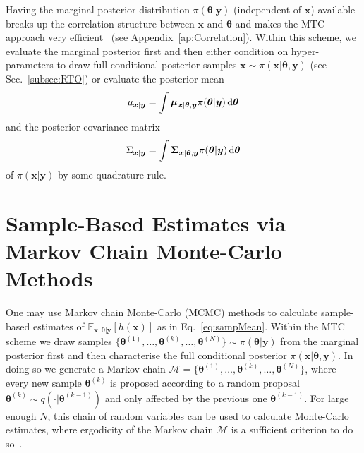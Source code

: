 Having the marginal posterior distribution $\pi (\bm{\theta}| \bm{y})$ (independent of $\bm{x}$) available breaks up the correlation structure between $\bm{x}$ and $\bm{\theta}$ and makes the MTC approach very efficient~\cite{fox2016fast} (see Appendix~\ref{ap:Correlation}).
Within this scheme, we evaluate the marginal posterior first and then either condition on hyper-parameters to draw full conditional posterior samples $\bm{x} \sim \pi (\bm{x} | \bm{\theta}, \bm{y})$ (see Sec.~\ref{subsec:RTO}) or evaluate the posterior mean
\begin{align}
	\mu_{\bm{x}|\bm{y}} = \int \bm{\mu}_{\bm{x} | \bm{\theta} , \bm{y}} \pi(\bm{\theta}| \bm{y}) \mathop{}\!\mathrm{d} \bm{\theta} \label{eq:MeanGenInt}
\end{align} and the posterior covariance matrix
\begin{align}
	\Sigma_{\bm{x}|\bm{y}} = \int \bm{\Sigma}_{\bm{x} | \bm{\theta} , \bm{y}} \pi(\bm{\theta}| \bm{y}) \mathop{}\!\mathrm{d} \bm{\theta}\label{eq:CoVarGenInt}
\end{align}
of $\pi(\bm{x}| \bm{y})$ by some quadrature rule.

\section{Sample-Based Estimates via Markov Chain Monte-Carlo Methods}
One may use Markov chain Monte-Carlo (MCMC) methods to calculate sample-based estimates of $\mathbb{E}_{\bm{x} ,\bm{\theta}  |\bm{y}} [h(\bm{x})] $ as in Eq.~\ref{eq:sampMean}.
Within the MTC scheme we draw samples $\{  \bm{\theta}^{(1)}, \dots,  \bm{\theta}^{(k)}, \dots, \bm{\theta}^{(N)} \} \sim \pi(\bm{\theta} | \bm{y})$ from the marginal posterior first and then characterise the full conditional posterior $\pi(\bm{x}|\bm{\theta} , \bm{y})$.
In doing so we generate a Markov chain $\mathcal{M} = \{  \bm{\theta}^{(1)}, \dots,  \bm{\theta}^{(k)}, \dots, \bm{\theta}^{(N)} \} $, where every new sample $\bm{\theta}^{(k)}$ is proposed according to a random proposal $\bm{\theta}^{(k)} \sim q( \cdot |  \bm{\theta}^{(k-1)})$ and only affected by the previous one $\bm{\theta}^{(k-1)}$.
For large enough $N$, this chain of random variables can be used to calculate Monte-Carlo estimates, where ergodicity of the Markov chain $\mathcal{M}$ is a sufficient criterion to do so~\cite{tan2016LecNot, roberts2004general}.

